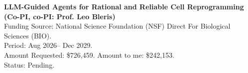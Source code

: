 \noindent \textbf{LLM-Guided Agents for Rational and Reliable Cell Reprogramming (Co-PI, co-PI: Prof. Leo Bleris)}  \\
\indent Funding Source: National Science Foundation (NSF) Direct For Biological Sciences (BIO). \\
\indent Period: Aug 2026-- Dec 2029. \\ 
\indent Amount Requested: \$726,459. Amount to me: \$242,153. \\
\indent Status: Pending. \\










